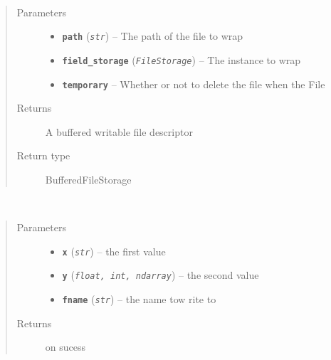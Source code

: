 \documentclass[letterpaper,10pt,english]{sphinxmanual}
\begin{document}

\begin{fulllineitems}
\label{docstring_examples:abc_pack.docstring_examples.rst_style}~\begin{quote}\begin{description}
\item[{Parameters}] \leavevmode\begin{itemize}
\item {} 
\textbf{\texttt{path}} (\emph{\texttt{str}}) -- The path of the file to wrap

\item {} 
\textbf{\texttt{field\_storage}} (\emph{\texttt{FileStorage}}) -- The  instance to wrap

\item {} 
\textbf{\texttt{temporary}} -- Whether or not to delete the file when the File

\end{itemize}

\item[{Returns}] \leavevmode
A buffered writable file descriptor

\item[{Return type}] \leavevmode
BufferedFileStorage

\end{description}\end{quote}

\end{fulllineitems}


\begin{fulllineitems}
\label{docstring_examples:abc_pack.docstring_examples.sphynx_style}~\begin{quote}\begin{description}
\item[{Parameters}] \leavevmode\begin{itemize}
\item {} 
\textbf{\texttt{x}} (\emph{\texttt{str}}) -- the first value

\item {} 
\textbf{\texttt{y}} (\emph{\texttt{float, int, ndarray}}) -- the second value

\item {} 
\textbf{\texttt{fname}} (\emph{\texttt{str}}) -- the name tow rite to

\end{itemize}

\item[{Returns}]  on sucess

\end{description}\end{quote}

\end{fulllineitems}
\end{document}
